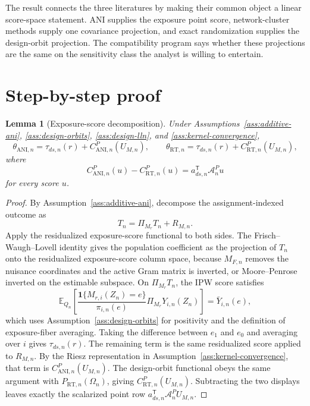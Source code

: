 \documentclass[11pt]{article}
\newcommand{\E}{\mathbb{E}}
\newcommand{\one}{\mathbf{1}}
\newcommand{\transpose}{\mathsf{T}}
\theoremstyle{definition}
\theoremstyle{plain}
\newtheorem{lemma}{Lemma}
\theoremstyle{remark}
\begin{document}
The result connects the three literatures by making their common object a
linear score-space statement.  ANI supplies the exposure point score,
network-cluster methods supply one covariance projection, and exact
randomization supplies the design-orbit projection.  The compatibility
program says whether these projections are the same on the sensitivity class
the analyst is willing to entertain.

\section{Step-by-step proof}
\begin{lemma}[Exposure-score decomposition]\label{lem:point-decomposition}
Under Assumptions~\ref{ass:additive-ani}, \ref{ass:design-orbits},
\ref{ass:design-lln}, and \ref{ass:kernel-convergence},
\[
  \theta_{\mathrm{ANI},n}
  =
  \tau_{ds,n}(r)+C_{\mathrm{ANI},n}^P(U_{M,n}),
  \qquad
  \theta_{\mathrm{RT},n}
  =
  \tau_{ds,n}(r)+C_{\mathrm{RT},n}^P(U_{M,n}),
\]
where
\[
  C_{\mathrm{ANI},n}^P(u)-C_{\mathrm{RT},n}^P(u)
  =
  a_{ds,n}^{\transpose}\mathcal A^P_nu
\]
for every score \(u\).
\end{lemma}

\begin{proof}
By Assumption~\ref{ass:additive-ani}, decompose the assignment-indexed outcome
as
\[
  T_n=\Pi_{M_r}T_n+R_{M,n}.
\]
Apply the residualized exposure-score functional to both sides.  The
Frisch--Waugh--Lovell identity gives the population coefficient as the
projection of \(T_n\) onto the residualized exposure-score column space,
because \(M_{F,n}\) removes the nuisance coordinates and the active Gram
matrix is inverted, or Moore--Penrose inverted on the estimable subspace.  On
\(\Pi_{M_r}T_n\), the IPW score satisfies
\[
  \E_{Q_n}\!\left[
    \frac{\one\{M_{r,i}(Z_n)=e\}}{\pi_{i,n}(e)}
    \Pi_{M_r}Y_{i,n}(Z_n)
  \right]
  =
  \bar Y_{i,n}(e),
\]
which uses Assumption~\ref{ass:design-orbits} for positivity and the
definition of exposure-fiber averaging.  Taking the difference between
\(e_1\) and \(e_0\) and averaging over \(i\) gives
\(\tau_{ds,n}(r)\).  The remaining term is the same residualized score applied
to \(R_{M,n}\).  By the Riesz representation in
Assumption~\ref{ass:kernel-convergence}, that term is
\(C_{\mathrm{ANI},n}^P(U_{M,n})\).  The design-orbit functional obeys the same
argument with \(P_{\mathrm{RT},n}(\Omega_n)\), giving
\(C_{\mathrm{RT},n}^P(U_{M,n})\).  Subtracting the two displays leaves exactly
the scalarized point row \(a_{ds,n}^{\transpose}\mathcal A^P_nU_{M,n}\).
\end{proof}
\end{document}
